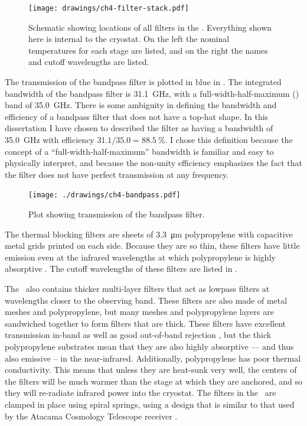 \begin{figure}
\centering
\texttt{[image: drawings/ch4-filter-stack.pdf]}
\caption[Schematic showing locations of all filters in the \Imager]{
  Schematic showing locations of all filters in the \Imager.
  Everything shown here is internal to the cryostat.
  On the left the nominal temperatures for each stage are listed, and on the right the names and cutoff wavelengths are listed.
}
\label{fig:ch4-filter-stack}
\end{figure}

The transmission of the bandpass filter is plotted in blue in .
The integrated bandwidth of the bandpass filter is \SI{31.1}{\GHz}, with a full-width-half-maximum (\FWHM) band of \SI{35.0}{\GHz}.
There is some ambiguity in defining the bandwidth and efficiency of a bandpass filter that does not have a top-hat shape.
In this dissertation I have chosen to described the filter as having a bandwidth of \SI{35.0}{\GHz} with efficiency $31.1 / 35.0 = \SI{88.5}{\percent}$.
I chose this definition because the concept of a ``full-width-half-maximum'' bandwidth is familiar and easy to physically interpret, and because the non-unity efficiency emphasizes the fact that the filter does not have perfect transmission at any frequency.

\begin{figure}
\centering
\texttt{[image: ./drawings/ch4-bandpass.pdf]}
\caption[Plot showing transmission of the bandpass filter.]{
  Plot showing transmission of the bandpass filter.
}
\label{fig:ch4-bandpass}
\end{figure}

The thermal blocking filters are sheets of \SI{3.3}{\um} polypropylene with capacitive metal grids printed on each side.
Because they are so thin, these filters have little emission even at the infrared wavelengths at which polypropylene is highly absorptive \cite{tucker_thermal_2006}.
The cutoff wavelengths of these filters are listed in .

The \Imager\ also contains thicker multi-layer filters that act as lowpass filters at wavelengths closer to the observing band.
These filters are also made of metal meshes and polypropylene, but many meshes and polypropylene layers are sandwiched together to form filters that are  thick.
These filters have excellent transmission in-band as well as good out-of-band rejection \cite{ade_review_2006}, but the thick polypropylene substrates mean that they are also highly absorptive --- and thus also emissive -- in the near-infrared.
Additionally, polypropylene has poor thermal conductivity.
This means that unless they are heat-sunk very well, the centers of the filters will be much warmer than the stage at which they are anchored, and so they will re-radiate infrared power into the cryostat.
The filters in the \Imager\ are clamped in place using spiral springs, using a design that is similar to that used by the Atacama Cosmology Telescope receiver \cite{swetz_overview_2011}.

